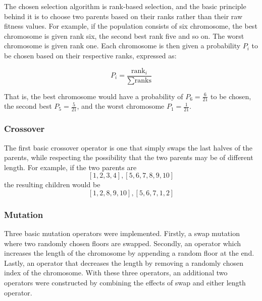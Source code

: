 The chosen selection algorithm is rank-based selection, and the basic principle behind it is to choose two parents based on their ranks rather than their raw fitness values. For example, if the population consists of six chromosome, the best chromosome is given rank six, the second best rank five and so on. The worst chromosome is given rank one. Each chromosome is then given a probability $ P_i $ to be chosen based on their respective ranks, expressed as:

$$ P_i = \frac{\text{rank}_i}{\sum \text{ranks}} $$

That is, the best chromosome would have a probability of $ P_6 = \frac{6}{21} $ to be chosen, the second best $ P_5 = \frac{5}{21} $, and the worst chromosome $ P_1 = \frac{1}{21} $.

\subsubsection{Crossover}
\begin{par}
	The first basic crossover operator is one that simply swaps the last halves of the parents, while respecting the possibility that the two parents may be of different length. For example, if the two parents are
	\[
		[1, 2, 3, 4], [5, 6, 7, 8, 9, 10]
	\]
	the resulting children would be
	\[
		[1, 2, 8, 9, 10], [5, 6, 7, 1, 2]
	\]
	\label{par:swap last halves}
\end{par}



\subsubsection{Mutation}
\label{subsubsec:mutation}

Three basic mutation operators were implemented. Firstly, a swap mutation where two randomly chosen floors are swapped. Secondly, an operator which increases the length of the chromosome by appending a random floor at the end. Lastly, an operator that decreases the length by removing a randomly chosen index of the chromosome. With these three operators, an additional two operators were constructed by combining the effects of swap and either length operator.


